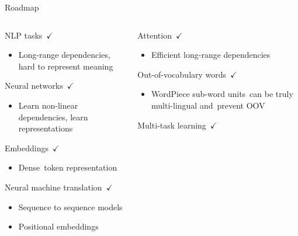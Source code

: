 \documentclass[12pt]{beamer}
\begin{document}
\begin{frame}{Roadmap}

\begin{columns}
	
\begin{column}{0.5\linewidth}
	
	
NLP tasks $\checkmark$

\begin{itemize}
	\item {\scriptsize Long-range dependencies, hard to represent meaning}
\end{itemize}

Neural networks $\checkmark$

\begin{itemize}
	\item {\scriptsize Learn non-linear dependencies, learn representations}
\end{itemize}

Embeddings $\checkmark$

\begin{itemize}
	\item {\scriptsize Dense token representation}
\end{itemize}

Neural machine translation $\checkmark$

\begin{itemize}
	\item {\scriptsize Sequence to sequence models}
	\item {\scriptsize Positional embeddings}
\end{itemize}

\end{column}

\begin{column}{0.5\linewidth}

Attention $\checkmark$

\begin{itemize}
	\item {\scriptsize Efficient long-range dependencies}
\end{itemize}


Out-of-vocabulary words $\checkmark$

\begin{itemize}
	\item {\scriptsize WordPiece sub-word units can be truly multi-lingual and prevent OOV}
\end{itemize}


Multi-task learning $\checkmark$


\end{column}
\end{columns}
\end{frame}
\end{document}
